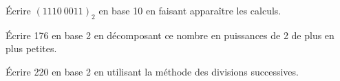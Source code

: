 \documentclass[a4paper,12pt,eval,firamath]{nsi}
\begin{document}
\maketitle


\'Ecrire $(1110\ 0011)_2$ en base 10 en faisant apparaître les calculs.\\


\'Ecrire 176 en base 2 en décomposant ce nombre en puissances de 2 de plus en plus petites.\\


\'Ecrire 220 en base 2 en utilisant la méthode des divisions successives.\\

\end{document}
